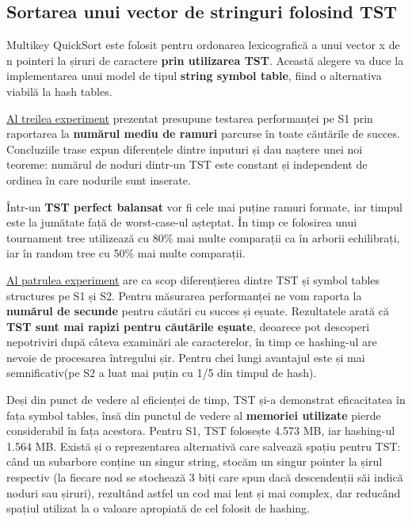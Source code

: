 \documentclass[12pt,a4paper]{article}
\begin{document}
\begin{singlespace}
\subsection{Sortarea unui vector de stringuri folosind TST}
Multikey QuickSort este folosit pentru ordonarea lexicografică a unui vector x de n pointeri la șiruri de caractere \textbf{prin utilizarea TST}. Această alegere va duce la implementarea unui model de tipul \textbf{string symbol table}, fiind o alternativa viabilă la hash tables.
\par
\underline{Al treilea experiment} prezentat presupune testarea performanței pe S1 prin raportarea la \textbf{numărul mediu de ramuri} parcurse în toate căutările de succes. Concluziile trase expun diferențele dintre inputuri și dau naștere unei noi teoreme: numărul de noduri dintr-un TST este constant și independent de ordinea în care nodurile sunt inserate. 
\par
Într-un \textbf{TST perfect balansat} vor fi cele mai puține ramuri formate, iar timpul este la jumătate față de worst-case-ul așteptat. În timp ce folosirea unui tournament tree utilizează cu 80\% mai multe comparații ca în arborii echilibrați, iar în random tree cu 50\% mai multe comparații.
\par
\underline{Al patrulea experiment} are ca scop diferențierea dintre TST și symbol tables structures pe S1 și S2. Pentru măsurarea performanței ne vom raporta la \textbf{numărul de secunde} pentru căutări cu succes și eșuate. Rezultatele arată că \textbf{TST sunt mai rapizi pentru căutările eșuate}, deoarece pot descoperi nepotriviri după câteva examinări ale caracterelor, în timp ce hashing-ul are nevoie de procesarea întregului șir. Pentru chei lungi avantajul este și mai semnificativ(pe S2 a luat mai puțin cu 1/5 din timpul de hash).
\par
Deși din punct de vedere al eficienței de timp, TST și-a demonstrat eficacitatea în fața symbol tables, însă din punctul de vedere al \textbf{memoriei utilizate} pierde considerabil în fața acestora. Pentru S1, TST folosește 4.573 MB, iar hashing-ul 1.564 MB. Există și o reprezentarea alternativă care salvează spațiu pentru TST: când un subarbore conține un singur string, stocăm un singur pointer la șirul respectiv (la fiecare nod se stochează 3 biți care spun dacă descendenții săi indică noduri sau șiruri), rezultând astfel un cod mai lent și mai complex, dar reducând spațiul utilizat la o valoare apropiată de cel folosit de hashing.


\end{singlespace}
\end{document}
